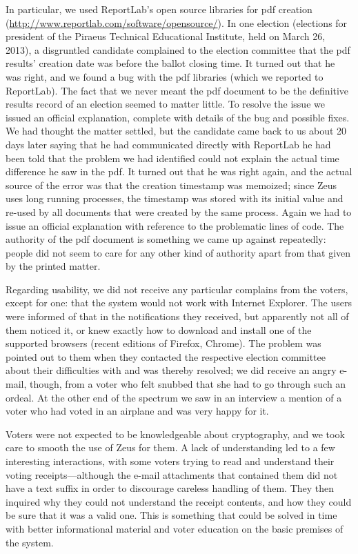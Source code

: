 \documentclass[letterpaper,10pt]{article}
\begin{document}
In particular, we used ReportLab's open source libraries for {\sc pdf}
creation (\url{http://www.reportlab.com/software/opensource/}). In one
election (elections for president of the Piraeus Technical Educational
Institute, held on March 26, 2013), a disgruntled candidate complained
to the election committee that the {\sc pdf} results' creation date
was before the ballot closing time. It turned out that he was right,
and we found a bug with the {\sc pdf} libraries (which we reported to
ReportLab). The fact that we never meant the {\sc pdf} document to be
the definitive results record of an election seemed to matter little.
To resolve the issue we issued an official explanation, complete with
details of the bug and possible fixes. We had thought the matter
settled, but the candidate came back to us about 20 days later saying
that he had communicated directly with ReportLab he had been told that
the problem we had identified could not explain the actual time
difference he saw in the {\sc pdf}. It turned out that he was right
again, and the actual source of the error was that the creation
timestamp was memoized; since Zeus uses long running processes, the
timestamp was stored with its initial value and re-used by all
documents that were created by the same process. Again we had to issue
an official explanation with reference to the problematic lines of
code. The authority of the {\sc pdf} document is something we came up
against repeatedly: people did not seem to care for any other kind of
authority apart from that given by the printed matter.

Regarding usability, we did not receive any particular complains from
the voters, except for one: that the system would not work with
Internet Explorer. The users were informed of that in the
notifications they received, but apparently not all of them noticed
it, or knew exactly how to download and install one of the supported
browsers (recent editions of Firefox, Chrome). The problem was pointed
out to them when they contacted the respective election committee
about their difficulties with and was thereby resolved; we did receive
an angry e-mail, though, from a voter who felt snubbed that she had
to go through such an ordeal. At the other end of the spectrum we saw
in an interview a mention of a voter who had voted in an airplane and
was very happy for it.

Voters were not expected to be knowledgeable about cryptography, and
we took care to smooth the use of Zeus for them. A lack of
understanding led to a few interesting interactions, with some voters
trying to read and understand their voting receipts---although the
e-mail attachments that contained them did not have a text suffix in
order to discourage careless handling of them. They then inquired why
they could not understand the receipt contents, and how they could be
sure that it was a valid one. This is something that could be solved
in time with better informational material and voter education on the
basic premises of the system.
\end{document}

